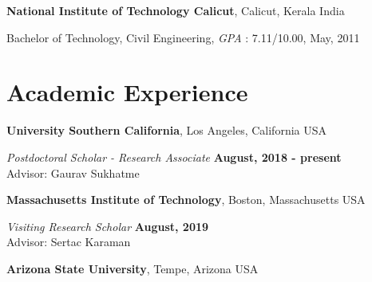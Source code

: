 \documentclass[margin,line]{res}
\newenvironment{list1}{
  \begin{list}{\ding{113}}{%
      \setlength{\itemsep}{0in}
      \setlength{\parsep}{0in} \setlength{\parskip}{0in}
      \setlength{\topsep}{0in} \setlength{\partopsep}{0in} 
      \setlength{\leftmargin}{0.17in}}}{\end{list}}
\begin{document}
\begin{resume}

{\bf National Institute of Technology Calicut}, Calicut, Kerala India\\
\vspace*{-.1in}
\begin{list1}
\item[] Bachelor of Technology, Civil Engineering, \textit{GPA} : 7.11/10.00, May, 2011
\end{list1}



%

\section{\sc Academic Experience}
{\bf University Southern California}, Los Angeles, California USA

\vspace{-.3cm}
{\em Postdoctoral Scholar - Research Associate} \hfill {\bf August, 2018 - present}\\
Advisor:  Gaurav Sukhatme

{\bf Massachusetts Institute of Technology}, Boston, Massachusetts USA

\vspace{-.3cm}
{\em Visiting Research Scholar} \hfill {\bf August, 2019}\\
Advisor:  Sertac Karaman


{\bf Arizona State University}, Tempe, Arizona USA


\end{resume}
\end{document}
